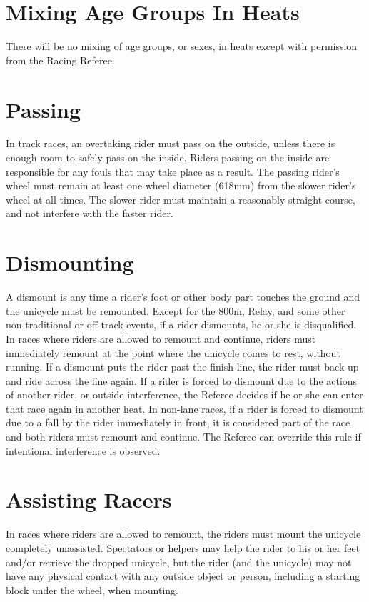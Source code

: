 \section{Mixing Age Groups In Heats}
There will be no mixing of age groups, or sexes, in heats except with permission from the Racing Referee.

\section{Passing}
In track races, an overtaking rider must pass on the outside, unless there is enough room to safely pass on the inside.
Riders passing on the inside are responsible for any fouls that may take place as a result.
The passing rider's wheel must remain at least one wheel diameter (618mm) from the slower rider's wheel at all times.
The slower rider must maintain a reasonably straight course, and not interfere with the faster rider.

\section{Dismounting}
A dismount is any time a rider's foot or other body part touches the ground and the unicycle must be remounted.
Except for the 800m, Relay, and some other non-traditional or off-track events, if a rider dismounts, he or she is disqualified.
In races where riders are allowed to remount and continue, riders must immediately remount at the point where the unicycle comes to rest, without running.
If a dismount puts the rider past the finish line, the rider must back up and ride across the line again.
If a rider is forced to dismount due to the actions of another rider, or outside interference, the Referee decides if he or she can enter that race again in another heat.
In non-lane races, if a rider is forced to dismount due to a fall by the rider immediately in front, it is considered part of the race and both riders must remount and continue.
The Referee can override this rule if intentional interference is observed.

\section{Assisting Racers}
In races where riders are allowed to remount, the riders must mount the unicycle completely unassisted.
Spectators or helpers may help the rider to his or her feet and/or retrieve the dropped unicycle, but the rider (and the unicycle) may not have any physical contact with any outside object or person, including a starting block under the wheel, when mounting.

